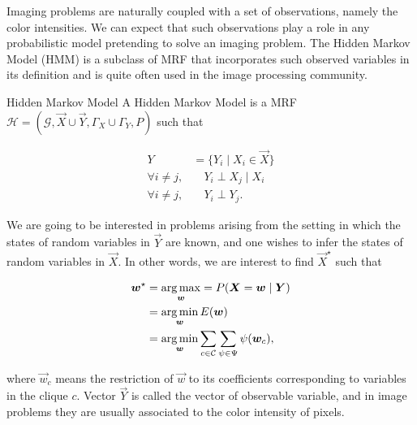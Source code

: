 Imaging problems are naturally coupled with a set of observations, namely the color intensities. We can expect that such observations play a role in any probabilistic model pretending to solve an imaging problem. The Hidden Markov Model (HMM) is a subclass of MRF that incorporates such observed variables in its definition and is quite often used in the image processing community.

\begin{definition}{Hidden Markov Model}
A Hidden Markov Model is a MRF $\mathcal{H} = (\mathcal{G},\vec{X} \cup \vec{Y}, \Gamma_X \cup \Gamma_Y,P)$ such that

\begin{align*}
	Y &= \{ Y_i \; | \; X_i \in \vec{X} \} \\
	\forall i \neq j,& \quad Y_i \perp X_j \; | \; X_i \\
	\forall i \neq j,& \quad Y_i \perp Y_j	.
\end{align*}
\end{definition}

We are going to be interested in problems arising from the setting in which the states of random variables in $\vec{Y}$ are known, and one wishes to infer the states of random variables in $\vec{X}$. In other words, we are interest to find $\vec{X}^{\star}$ such that

\begin{align}
	\bm{w}^{\star} &= \operatorname*{arg\,max}_{\bm{w}} = P(\bm{X} = \bm{w} \; | \; \bm{Y}) \nonumber \\
	&= \operatorname*{arg\,min}_{\bm{w}}{E(\bm{w})} \nonumber \\
	&= \operatorname*{arg\,min}_{\bm{w}}{ \sum_{c \in \mathcal{C}}\sum_{\psi \in \Psi}{\psi(\bm{w}_c})},
	\label{ch2:eq:general-maximum-likelihood}
\end{align}

where $\vec{w}_c$ means the restriction of $\vec{w}$ to its coefficients corresponding to variables in the clique $c$.  Vector $\vec{Y}$ is called the vector of observable variable, and in image problems they are usually associated to the color intensity of pixels. 

